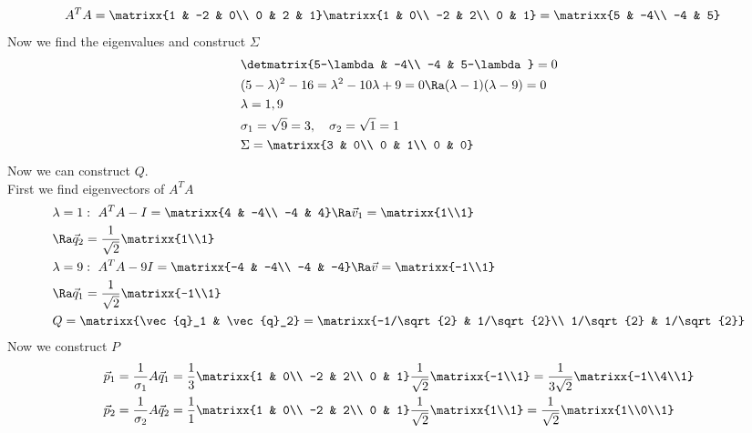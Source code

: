 \begin{align*}
    &A^TA=\matrixx{1 & -2 & 0\\ 0 & 2 & 1}\matrixx{1 & 0\\ -2 & 2\\ 0 & 1}=\matrixx{5 & -4\\ -4 & 5}
\end{align*}
Now we find the eigenvalues and construct $\Sigma$
\begin{align*}
    &\detmatrix{5-\lambda & -4\\ -4 & 5-\lambda}=0\\
    &(5-\lambda)^2-16=\lambda^2-10\lambda+9=0\Ra (\lambda-1)(\lambda-9)=0\\
    &\lambda=1,9\\
    &\sigma_1=\sqrt{9}=3,\quad \sigma_2=\sqrt{1}=1\\
    &\Sigma=\matrixx{3 & 0\\ 0 & 1\\ 0 & 0}
\end{align*}
Now we can construct $Q$.\\
First we find eigenvectors of $A^TA$
\begin{align*}
    &\lambda=1:\ A^TA-I=\matrixx{4 & -4\\ -4 & 4}\Ra \vec{v}_1=\matrixx{1\\1}\\
    &\Ra \vec{q}_2=\frac{1}{\sqrt{2}}\matrixx{1\\1}\\
    &\lambda=9:\ A^TA-9I=\matrixx{-4 & -4\\ -4 & -4}\Ra \vec{v}=\matrixx{-1\\1}\\
    &\Ra \vec{q}_1=\frac{1}{\sqrt{2}}\matrixx{-1\\1}\\
    &Q=\matrixx{\vec{q}_1 & \vec{q}_2}=\matrixx{-1/\sqrt{2} & 1/\sqrt{2}\\ 1/\sqrt{2} & 1/\sqrt{2}}
\end{align*}
Now we construct $P$
\begin{align*}
    &\vec{p}_1=\frac{1}{\sigma_1}A\vec{q}_1=\frac{1}{3}\matrixx{1 & 0\\ -2 & 2\\ 0 & 1}\frac{1}{\sqrt{2}}\matrixx{-1\\1}=\frac{1}{3\sqrt{2}}\matrixx{-1\\4\\1}\\
    &\vec{p}_2=\frac{1}{\sigma_2}A\vec{q}_2=\frac{1}{1}\matrixx{1 & 0\\ -2 & 2\\ 0 & 1}\frac{1}{\sqrt{2}}\matrixx{1\\1}=\frac{1}{\sqrt{2}}\matrixx{1\\0\\1}
\end{align*}
